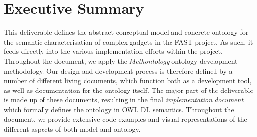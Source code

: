 \documentclass{article}
\begin{document}
\section*{Executive Summary}
\doublespacing

This deliverable defines the abstract conceptual model and concrete ontology for the semantic characterisation of complex gadgets in the FAST project. As such, it feeds directly into the various implementation efforts within the project. 
Throughout the document, we apply the \emph{Methontology} ontology development methodology. Our design and development process is therefore defined by a number of different living documents, which function both as a development tool, as well as documentation for the ontology itself. The major part of the deliverable is made up of these documents, resulting in the final \emph{implementation document} which formally defines the ontology in OWL DL semantics. Throughout the document, we provide extensive code examples and visual representations of the different aspects of both model and ontology.

\newpage


\clearpage
\end{document}
